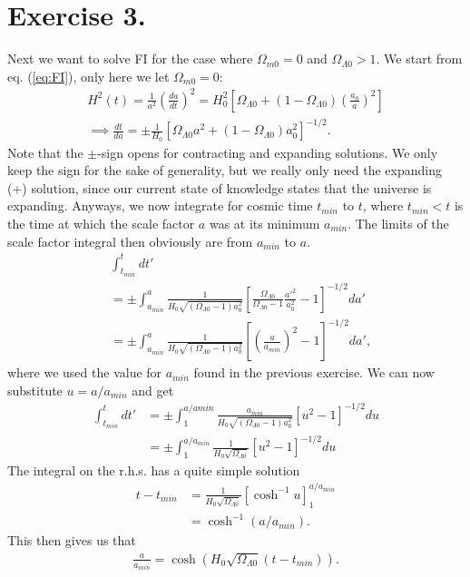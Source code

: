 \documentclass{emulateapj}
\begin{document}
	\section*{Exercise 3.}
	Next we want to solve FI for the case where $\Omega_{m 0} = 0$ and $\Omega_{\Lambda 0}>1$. We start from eq. (\ref{eq:FI}), only here we let $\Omega_{m 0} = 0$:
	\begin{align}
		H^2(t) = \frac{1}{a^2}\left(\frac{da}{dt}\right)^2 = H_0^2\left[\Omega_{\Lambda 0} + (1-\Omega_{\Lambda 0})\left(\frac{a_0}{a}\right)^2\right]\\
		\implies \frac{dt}{da} = \pm\frac{1}{H_0}\left[\Omega_{\Lambda 0}a^2 + (1-\Omega_{\Lambda 0})a_0^2\right]^{-1/2}.
	\end{align}
	Note that the $\pm$-sign opens for contracting and expanding solutions. We only keep the sign for the sake of generality, but we really only need the expanding (+) solution, since our current state of knowledge states that the universe is expanding.
	Anyways, we now integrate for cosmic time $t_{min}$ to $t$, where $t_{min}<t$ is the time at which the scale factor $a$ was at its minimum $a_{min}$. The limits of the scale factor integral then obviously are from $a_{min}$ to $a$.
	\begin{align*}
		&\int_{t_{min}}^{t}dt' \\
		&= \pm\int_{a_{min}}^{a}\frac{1}{H_0\sqrt{(\Omega_{\Lambda 0} - 1)a_0^2}}\left[\frac{\Omega_{\Lambda 0}}{\Omega_{\Lambda 0} - 1}\frac{a'^2}{a_0^2} - 1\right]^{-1/2}da'\\
		&= \pm\int_{a_{min}}^{a}\frac{1}{H_0\sqrt{(\Omega_{\Lambda 0} - 1)a_0^2}}\left[\left(\frac{a}{a_{min}}\right)^2 - 1\right]^{-1/2}da',
	\end{align*}
	where we used the value for $a_{min}$ found in the previous exercise. We can now substitute $u = a/a_{min}$ and get
	\begin{align*}
		\int_{t_{min}}^{t}dt' &= \pm \int_{1}^{a/a{min}}\frac{a_{min}}{H_0\sqrt{(\Omega_{\Lambda 0}-1)a_0^2}}[u^2-1]^{-1/2}du\\
		&= \pm\int_{1}^{a/a_{min}}\frac{1}{H_0\sqrt{\Omega_{\Lambda 0}}}[u^2 - 1]^{-1/2}du
	\end{align*}
	The integral on the r.h.s. has a quite simple solution
	\begin{align*}
		t-t_{min} &= \frac{1}{H_0\sqrt{\Omega_{\Lambda 0}}}[\cosh^{-1}u]_1^{a/a_{min}}\\
		&=\cosh^{-1}(a/a_{min}).
	\end{align*}
	This then gives us that 
	\begin{align*}
		\frac{a}{a_{min}} = \cosh(H_0 \sqrt{\Omega_{\Lambda 0}}(t-t_{min})). 
	\end{align*}
\end{document}

